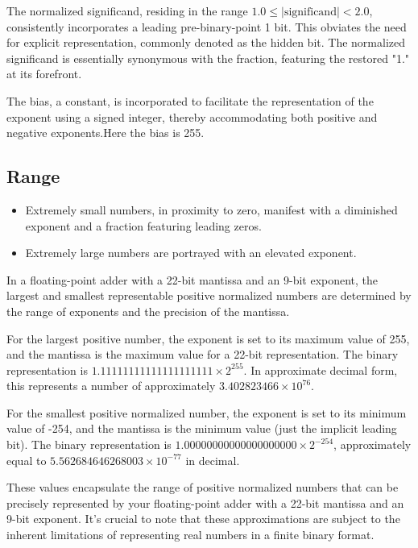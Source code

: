 \documentclass[a4paper,12pt]{article}
\begin{document}
The normalized significand, residing in the range \(1.0 \leq \lvert
\text{significand} \rvert < 2.0\), consistently incorporates a leading
pre-binary-point 1 bit. This obviates the need for explicit representation,
commonly denoted as the hidden bit. The normalized significand is essentially
synonymous with the fraction, featuring the restored "1." at its forefront.

The bias, a constant, is incorporated to facilitate the representation of the
exponent using a signed integer, thereby accommodating both positive and
negative exponents.Here the bias is 255.

\subsection{Range }

\begin{itemize}
    \item Extremely small numbers, in proximity to zero, manifest with a diminished
          exponent and a fraction featuring leading zeros.
    \item Extremely large numbers are portrayed with an elevated exponent.
\end{itemize}

In a floating-point adder with a 22-bit mantissa and an 9-bit exponent, the
largest and smallest representable positive normalized numbers are determined
by the range of exponents and the precision of the mantissa.

For the largest positive number, the exponent is set to its maximum value of
255, and the mantissa is the maximum value for a 22-bit representation. The
binary representation is \(1.11111111111111111111 \times 2^{255}\). In
approximate decimal form, this represents a number of approximately
\(3.402823466 \times 10^{76}\).

For the smallest positive normalized number, the exponent is set to its minimum
value of -254, and the mantissa is the minimum value (just the implicit leading
bit). The binary representation is \(1.00000000000000000000 \times 2^{-254}\),
approximately equal to \(5.562684646268003 \times 10^{-77}\) in decimal.

These values encapsulate the range of positive normalized numbers that can be
precisely represented by your floating-point adder with a 22-bit mantissa and
an 9-bit exponent. It's crucial to note that these approximations are subject
to the inherent limitations of representing real numbers in a finite binary
format.
\end{document}
